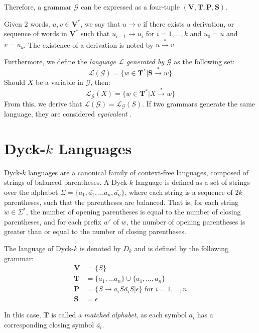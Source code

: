 Therefore, a grammar $\mathcal{G}$ can be expressed as a four-tuple $(\mathbf{V}, \mathbf{T}, \mathbf{P}, \mathbf{S})$. 

Given 2 words, $u, v \in \mathbf{V}^*$, we say that $u \rightarrow v$ if there exists a derivation, or sequence of words in $\mathbf{V}^*$ such that $u_{i-1} \rightarrow u_{i}$ for $i = 1,\dots,k$ and $u_0=u$ and $v=u_k$. The existence of a derivation is noted by $u \xrightarrow{*} v$

Furthermore, we define the \emph{language $\mathcal{L}$ generated by $\mathcal{G}$} as the following set:
$$
\mathcal{L}(\mathcal{G}) = \{w \in \mathbf{T}^* | \mathbf{S} \xrightarrow{*} w \}
$$
Should $X$ be a variable in $\mathcal{G}$, then:
$$
\mathcal{L}_{\mathcal{G}}(X) = \{ w \in \mathbf{T}^* | X \xrightarrow{*} w\}
$$
From this, we derive that $\mathcal{L}(\mathcal{G}) = \mathcal{L}_{\mathcal{G}}(S)$. If two grammars generate the same language, they are considered \emph{equivalent} \cite{leeuwen-cfg}.

\section{Dyck-$k$ Languages}

Dyck-$k$ languages are a canonical family of context-free languages, composed of strings of balanced parentheses.
A Dyck-$k$ language is defined as a set of strings over the alphabet $\Sigma = \{ a_1, \bar{a_1}, \dots a_n, \bar{a_n}\}$, where each string is a sequence of $2k$ parentheses, such that the parentheses are balanced. 
That is, for each string $w \in \Sigma^*$, the number of opening parentheses is equal to the number of closing parentheses, and for each prefix $w'$ of $w$, the number of opening parentheses is greater than or equal to the number of closing parentheses.

The language of Dyck-$k$ is denoted by $D_k$ and is defined by the following grammar:
\begin{align*}
    \mathbf{V} &= \{S\} \\
    \mathbf{T} &= \{a_1, \dots a_n\} \cup \{ \bar{a_1}, \dots, \bar{a_n} \}\\
    \mathbf{P} &= \{ S \rightarrow a_i S \bar{a_i} S | \epsilon \} \text{ for } i = 1, \dots, n \\
    \mathbf{S} &= \epsilon
\end{align*}

In this case, $\mathbf{T}$ is called a \emph{matched alphabet}, as each symbol $a_i$ has a corresponding closing symbol $\bar{a_i}$.

